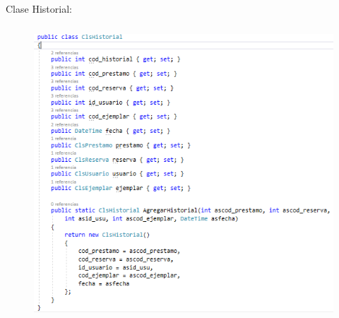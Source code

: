 \documentclass[12pt]{article}
\begin{document}
\begin{enumerate}[label*=\arabic*.]
\begin{enumerate}[label*=\arabic*.]
Clase Historial:
\begin{figure}[H]
	\begin{Center}
		\includegraphics[width=4.91in,height=4.35in]{./media/7.png}
	\end{Center}
\end{figure}




\end{enumerate}
\end{enumerate}\par


\vspace{\baselineskip}

\vspace{\baselineskip}

\vspace{\baselineskip}

\vspace{\baselineskip}

\printbibliography
\end{document}
